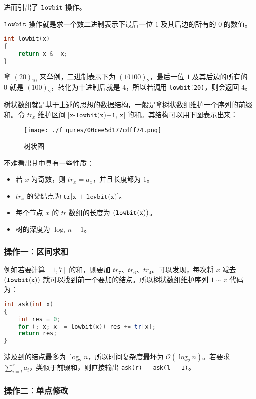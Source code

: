 进而引出了 $\tt lowbit$ 操作。

$\tt lowbit$ 操作就是求一个数二进制表示下最后一位 $1$ 及其后边的所有的 $0$ 的数值。

\begin{lstlisting}[language=cpp]
int lowbit(x)
{
    return x & -x;
}
\end{lstlisting}

拿 $(20)_{10}$ 来举例，二进制表示下为 $(10100)_2$，最后一位 $1$ 及其后边的所有的 $0$ 就是 $(100)_2$，转化为十进制后就是 $4$，所以若调用 \verb|lowbit(20)|，则会返回 $4$。

树状数组就是基于上述的思想的数据结构，一般是拿树状数组维护一个序列的前缀和。令 $tr_x$ 维护区间 $\texttt{[x-lowbit(x)+1, x]}$ 的和。其结构可以用下图表示出来：

\begin{figure}[ht]
\centering
\texttt{[image: ./figures/00cee5d177cdff74.png]}
\caption{树状图} \label{fig_BIT_2}
\end{figure}

不难看出其中具有一些性质：

\begin{itemize}
\item 若 $x$ 为奇数，则 $tr_x = a_x$，并且长度都为 $1$。
\item $tr_x$ 的父结点为 $\texttt{tr[x + lowbit(x)]}$。
\item 每个节点 $x$ 的 $tr$ 数组的长度为 $\tt (lowbit(x))$。
\item 树的深度为 $\log_2 n + 1$。
\end{itemize}

\subsubsection{操作一：区间求和}

例如若要计算 $[1, 7]$ 的和，则要加 $tr_7$、$tr_6$、$tr_4$。可以发现，每次将 $x$ 减去 $\tt(lowbit(x))$ 就可以找到前一个要加的结点。所以树状数组维护序列 $1 \sim x$ 代码为：

\begin{lstlisting}[language=cpp]
int ask(int x)
{
    int res = 0;
    for (; x; x -= lowbit(x)) res += tr[x];
    return res;
}
\end{lstlisting}

涉及到的结点最多为 $\log_2 n$，所以时间复杂度最坏为 $\mathcal{O}(\log_2 n)$。若要求 $\sum\limits^r_{i = l}a_i$，类似于前缀和，则直接输出 \verb|ask(r) - ask(l - 1)|。

\subsubsection{操作二：单点修改}

